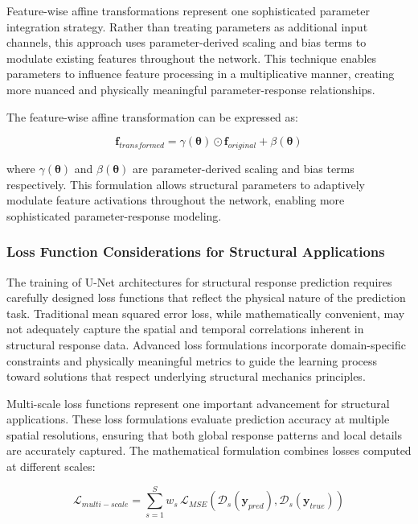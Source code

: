 \documentclass[12pt,a4paper]{report}
\begin{document}
Feature-wise affine transformations represent one sophisticated parameter integration strategy. Rather than treating parameters as additional input channels, this approach uses parameter-derived scaling and bias terms to modulate existing features throughout the network. This technique enables parameters to influence feature processing in a multiplicative manner, creating more nuanced and physically meaningful parameter-response relationships.

The feature-wise affine transformation can be expressed as:

\begin{equation}
\mathbf{f}_{transformed} = \gamma(\boldsymbol{\theta}) \odot \mathbf{f}_{original} + \beta(\boldsymbol{\theta})
\end{equation}

where $\gamma(\boldsymbol{\theta})$ and $\beta(\boldsymbol{\theta})$ are parameter-derived scaling and bias terms respectively. This formulation allows structural parameters to adaptively modulate feature activations throughout the network, enabling more sophisticated parameter-response modeling.

\subsubsection*{Loss Function Considerations for Structural Applications}

The training of U-Net architectures for structural response prediction requires carefully designed loss functions that reflect the physical nature of the prediction task. Traditional mean squared error loss, while mathematically convenient, may not adequately capture the spatial and temporal correlations inherent in structural response data. Advanced loss formulations incorporate domain-specific constraints and physically meaningful metrics to guide the learning process toward solutions that respect underlying structural mechanics principles.

Multi-scale loss functions represent one important advancement for structural applications. These loss formulations evaluate prediction accuracy at multiple spatial resolutions, ensuring that both global response patterns and local details are accurately captured. The mathematical formulation combines losses computed at different scales:

\begin{equation}
\mathcal{L}_{multi-scale} = \sum_{s=1}^{S} w_s \, \mathcal{L}_{MSE}(\mathcal{D}_s(\mathbf{y}_{pred}), \mathcal{D}_s(\mathbf{y}_{true}))
\end{equation}
\end{document}
